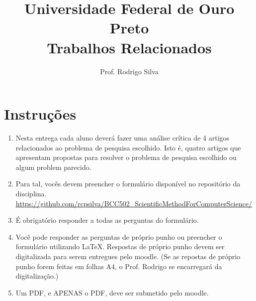 \documentclass{article}
\title{\vspace{-2 cm}Universidade Federal de Ouro Preto \\ \textbf{Trabalhos Relacionados}}
\author{Prof. Rodrigo Silva}
\date{}
\begin{document}
\maketitle

\section*{Instruções}

\begin{enumerate}
    \item Nesta entrega cada aluno deverá fazer uma análise crítica de 4 artigos relacionados ao problema de pesquisa escolhido. Isto é, quatro artigos que apresentam propostas para resolver o problema de pesquisa escolhido ou algum problem parecido. 
    \item Para tal, vocês devem preencher o formulário disponível no repositório da disciplina. \url{https://github.com/rcpsilva/BCC502_ScientificMethodForComputerScience/}
    \item É obrigatório responder a todas as perguntas do formulário. 
    \item Você pode responder as perguntas de próprio punho ou preencher o formulário utilizando LaTeX. Respostas de próprio punho devem ser digitalizada para serem entregues pelo moodle. (Se as repostas de próprio punho forem feitas em folhas A4, o Prof. Rodrigo se encarregará da digitalização.)
    \item Um PDF, e APENAS o PDF, deve ser submetido pelo moodle.  
\end{enumerate}    




%
%
\end{document}
